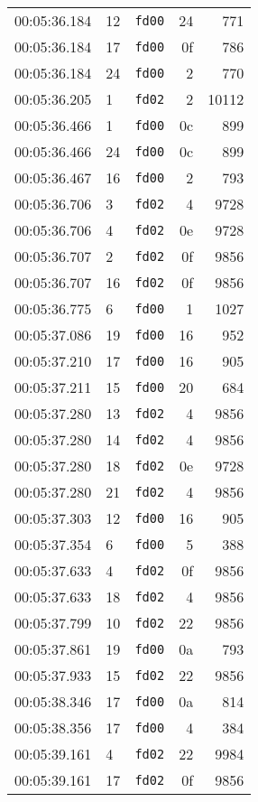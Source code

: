 \documentclass{article}
\begin{document}
\begin{longtable}{lllrr}
00:05:36.184 & 12 & \texttt{fd00} & 24 & 771 \\
00:05:36.184 & 17 & \texttt{fd00} & 0f & 786 \\
00:05:36.184 & 24 & \texttt{fd00} & 2 & 770 \\
00:05:36.205 & 1 & \texttt{fd02} & 2 & 10112 \\
00:05:36.466 & 1 & \texttt{fd00} & 0c & 899 \\
00:05:36.466 & 24 & \texttt{fd00} & 0c & 899 \\
00:05:36.467 & 16 & \texttt{fd00} & 2 & 793 \\
00:05:36.706 & 3 & \texttt{fd02} & 4 & 9728 \\
00:05:36.706 & 4 & \texttt{fd02} & 0e & 9728 \\
00:05:36.707 & 2 & \texttt{fd02} & 0f & 9856 \\
00:05:36.707 & 16 & \texttt{fd02} & 0f & 9856 \\
00:05:36.775 & 6 & \texttt{fd00} & 1 & 1027 \\
00:05:37.086 & 19 & \texttt{fd00} & 16 & 952 \\
00:05:37.210 & 17 & \texttt{fd00} & 16 & 905 \\
00:05:37.211 & 15 & \texttt{fd00} & 20 & 684 \\
00:05:37.280 & 13 & \texttt{fd02} & 4 & 9856 \\
00:05:37.280 & 14 & \texttt{fd02} & 4 & 9856 \\
00:05:37.280 & 18 & \texttt{fd02} & 0e & 9728 \\
00:05:37.280 & 21 & \texttt{fd02} & 4 & 9856 \\
00:05:37.303 & 12 & \texttt{fd00} & 16 & 905 \\
00:05:37.354 & 6 & \texttt{fd00} & 5 & 388 \\
00:05:37.633 & 4 & \texttt{fd02} & 0f & 9856 \\
00:05:37.633 & 18 & \texttt{fd02} & 4 & 9856 \\
00:05:37.799 & 10 & \texttt{fd02} & 22 & 9856 \\
00:05:37.861 & 19 & \texttt{fd00} & 0a & 793 \\
00:05:37.933 & 15 & \texttt{fd02} & 22 & 9856 \\
00:05:38.346 & 17 & \texttt{fd00} & 0a & 814 \\
00:05:38.356 & 17 & \texttt{fd00} & 4 & 384 \\
00:05:39.161 & 4 & \texttt{fd02} & 22 & 9984 \\
00:05:39.161 & 17 & \texttt{fd02} & 0f & 9856 \\

\end{longtable}
\end{document}

